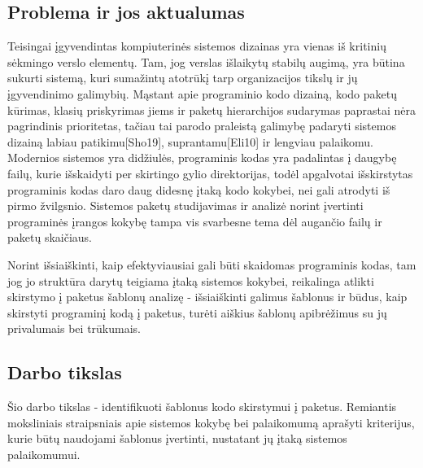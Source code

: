 \subsection{Problema ir jos aktualumas}
Teisingai įgyvendintas kompiuterinės sistemos dizainas yra vienas iš kritinių sėkmingo verslo
elementų.
Tam, jog verslas išlaikytų stabilų augimą, yra būtina sukurti sistemą, kuri sumažintų
atotrūkį tarp organizacijos tikslų ir jų įgyvendinimo galimybių.
Mąstant apie programinio kodo
dizainą, kodo paketų kūrimas, klasių priskyrimas jiems ir paketų hierarchijos sudarymas paprastai
nėra pagrindinis prioritetas, tačiau tai parodo praleistą galimybę padaryti sistemos dizainą labiau
patikimu[Sho19], suprantamu[Eli10] ir lengviau palaikomu.
Modernios sistemos yra didžiulės, programinis kodas yra padalintas į daugybę failų,
kurie išskaidyti per skirtingo gylio direktorijas, todėl apgalvotai išskirstytas programinis
kodas daro daug didesnę įtaką kodo kokybei, nei gali atrodyti iš pirmo žvilgsnio.
Sistemos paketų studijavimas ir analizė norint įvertinti programinės įrangos kokybę
tampa vis svarbesne tema dėl augančio failų ir paketų skaičiaus\cite{DesignMetrics}.


Norint išsiaiškinti, kaip efektyviausiai gali būti skaidomas programinis
kodas, tam jog jo struktūra darytų teigiama įtaką sistemos kokybei, reikalinga atlikti skirstymo į paketus šablonų analizę -
išsiaiškinti galimus šablonus ir būdus, kaip skirstyti programinį kodą į paketus, turėti aiškius šablonų apibrėžimus su jų
privalumais bei trūkumais.

\subsection{Darbo tikslas}
Šio darbo tikslas - identifikuoti šablonus kodo skirstymui į paketus.
Remiantis moksliniais straipsniais apie sistemos kokybę bei palaikomumą aprašyti kriterijus,
kurie būtų naudojami šablonus įvertinti, nustatant jų įtaką sistemos palaikomumui.

